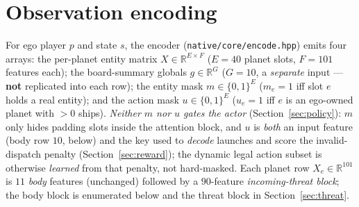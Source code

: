 \documentclass[11pt]{article}
\newcommand{\R}{\mathbb{R}}
\begin{document}
\section{Observation encoding}\label{sec:obs}
For ego player $p$ and state $s$, the encoder (\texttt{native/core/encode.hpp}) emits four arrays:
the per-planet entity matrix $X\in\R^{E\times F}$ ($E=40$ planet slots, $F=101$ features each); the
board-summary globals $g\in\R^{G}$ ($G=10$, a \emph{separate} input --- \textbf{not} replicated into
each row); the entity mask $m\in\{0,1\}^{E}$ ($m_e=1$ iff slot $e$ holds a real entity); and the
action mask $u\in\{0,1\}^{E}$ ($u_e=1$ iff $e$ is an ego-owned planet with $>0$ ships). \emph{Neither
$m$ nor $u$ gates the actor} (Section~\ref{sec:policy}): $m$ only hides padding slots inside the
attention block, and $u$ is \emph{both} an input feature (body row $10$, below) and the key used to
\emph{decode} launches and score the invalid-dispatch penalty (Section~\ref{sec:reward}); the dynamic
legal action subset is otherwise \emph{learned} from that penalty, not hard-masked. Each planet row
$X_e\in\R^{101}$ is $11$ \emph{body} features (unchanged) followed by a $90$-feature \emph{incoming-threat
block}; the body block is enumerated below and the threat block in Section~\ref{sec:threat}.
\end{document}

